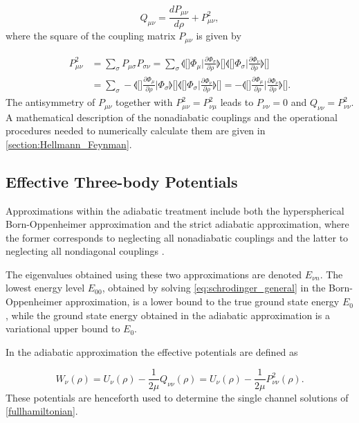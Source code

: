 \begin{equation}
Q_{\mu \nu} = \frac{dP_{\mu \nu}}{d\rho} + P^2_{\mu \nu},
\end{equation}
where the square of the coupling matrix $P_{\mu \nu}$ is given by

\begin{align}
P^2_{\mu \nu} &= \sum_{\sigma}P_{\mu \sigma}P_{\sigma \nu} = \sum_{\sigma}\llangle[\Big] \Phi_{\mu} \Big\lvert \frac{\partial \Phi_{\sigma}}{\partial\rho}  \rrangle[\Big]\llangle[\Big] \Phi_{\sigma} \Big\lvert \frac{\partial \Phi_{\nu}}{\partial\rho}  \rrangle[\Big]\nonumber\\
&=\sum_{\sigma}-\llangle[\Big]\frac{\partial \Phi_{\mu}}{\partial\rho} \Big\lvert  \Phi_{\sigma} \rrangle[\Big]\llangle[\Big] \Phi_{\sigma} \Big\lvert \frac{\partial \Phi_{\nu}}{\partial\rho}  \rrangle[\Big]=- \llangle[\Big] \frac{\partial \Phi_{\mu}}{\partial \rho}  \Big\lvert \frac{\partial \Phi_{\nu}}{\partial\rho}  \rrangle[\Big].
\end{align}
The antisymmetry of $P_{\mu\nu}$ together with $P_{\mu\nu}^2 = P_{\nu\mu}^2$ leads to $P_{\nu\nu} = 0$ and $Q_{\nu \nu} = P_{\nu\nu}^2$. A mathematical description of the nonadiabatic couplings and the operational procedures needed to numerically calculate them are given in \cref{section:Hellmann_Feynman}.

\subsection{Effective Three-body Potentials}
Approximations within the adiabatic treatment include both the hyperspherical Born-Oppenheimer approximation and the strict adiabatic approximation, where the former corresponds to neglecting all nonadiabatic couplings and the latter to neglecting all nondiagonal couplings \cite{Blume2002}. 

The eigenvalues obtained using these two approximations are denoted $E_{\nu n}$. The lowest energy level $E_{00}$, obtained by solving \eqref{eq:schrodinger_general} in the Born-Oppenheimer  approximation, is a lower bound to the true ground state energy $E_0$, while the ground state energy obtained in the adiabatic approximation is a variational upper bound to $E_{0}$. 

In the adiabatic approximation the effective potentials are defined as 

\begin{equation}
W_{\nu}(\rho) = U_{\nu}(\rho)-\frac{1}{2\mu}Q_{\nu \nu}(\rho) = U_{\nu}(\rho)-\frac{1}{2\mu}P_{\nu \nu}^2(\rho).
\end{equation} 
These potentials are henceforth used to determine the single channel solutions of \eqref{fullhamiltonian}. 

